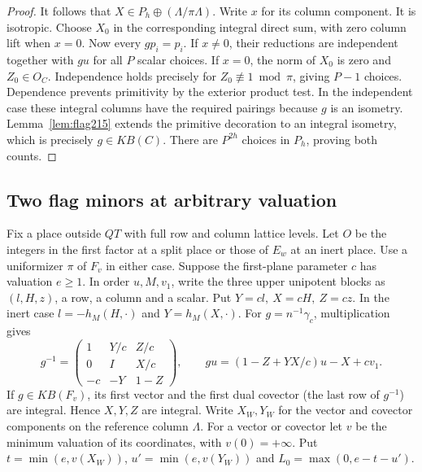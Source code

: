 \documentclass[a4paper,11pt]{article}
\theoremstyle{definition}
\theoremstyle{remark}
\numberwithin{equation}{section}
\begin{document}
\begin{proof}
It follows that \(X\in P_h\oplus(\Lambda/\pi\Lambda)\).
Write \(x\) for its column component. It is isotropic.
Choose \(X_0\) in the corresponding integral direct sum, with
zero column lift when \(x=0\). Now every \(gp_i=p_i\).
If \(x\ne0\), their reductions are independent together with
\(gu\) for all \(P\) scalar choices. If \(x=0\), the norm of
\(X_0\) is zero and \(Z_0\in O_C\). Independence holds
precisely for \(Z_0\not\equiv1\bmod\pi\), giving \(P-1\)
choices. Dependence prevents primitivity by the exterior
product test. In the independent case these integral columns
have the required pairings because \(g\) is an isometry.
Lemma~\ref{lem:flag215} extends the primitive decoration
to an integral isometry, which is precisely \(g\in K B(C)\).
There are \(P^{2h}\) choices in \(P_h\), proving both counts.
\end{proof}

\subsection{Two flag minors at arbitrary valuation}\label{nav:IV-48}
Fix a place outside \(QT\) with full row and column lattice
levels. Let \(O\) be the integers in the first factor at a
split place or those of \(E_w\) at an inert place. Use a
uniformizer \(\pi\) of \(F_v\) in either case. Suppose the
first-plane parameter \(c\) has valuation \(e\ge1\).
In order \(u,M,v_1\), write the three upper unipotent
blocks as \((l,H,z)\), a row, a column and a scalar.
Put \(Y=cl,\ X=cH,\ Z=cz\). In the inert case
\(l=-h_M(H,\cdot)\) and \(Y=h_M(X,\cdot)\).
For \(g=n^{-1}\gamma_c\), multiplication gives
\[
 g^{-1}=\begin{pmatrix}
 1&Y/c&Z/c\\0&I&X/c\\-c&-Y&1-Z
 \end{pmatrix},\qquad
 gu=(1-Z+YX/c)u-X+cv_1 .
\]
If \(g\in K B(F_v)\), its first vector and the first dual
covector (the last row of \(g^{-1}\)) are integral. Hence
\(X,Y,Z\) are integral. Write \(X_W,Y_W\) for the vector
and covector components on the reference column \(\Lambda\).
For a vector or covector let \(v\) be the minimum valuation
of its coordinates, with \(v(0)=+\infty\). Put
\(t=\min(e,v(X_W))\), \(u'=\min(e,v(Y_W))\) and
\(L_0=\max(0,e-t-u')\).
\end{document}
